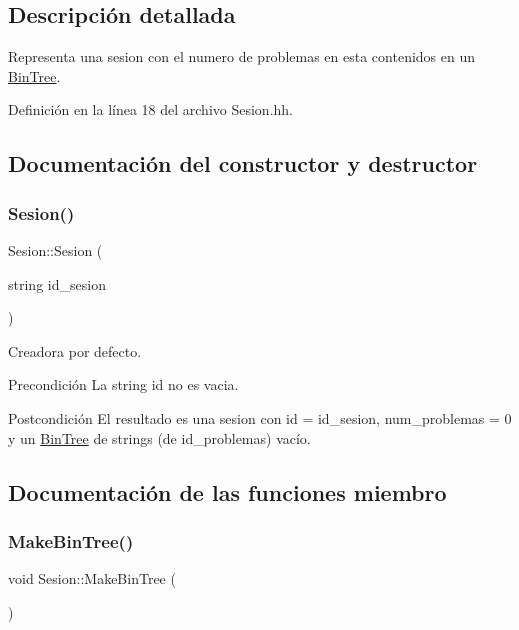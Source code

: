 \subsection{Descripción detallada}
Representa una sesion con el numero de problemas en esta contenidos en un \mbox{\hyperlink{class_bin_tree}{Bin\+Tree}}. 

Definición en la línea 18 del archivo Sesion.\+hh.



\subsection{Documentación del constructor y destructor}
\mbox{\label{class_sesion_a91a29b1563a9f089d6dc50933281a968}} 
\subsubsection{\texorpdfstring{Sesion()}{Sesion()}}
{\footnotesize\ttfamily Sesion\+::\+Sesion (\begin{DoxyParamCaption}\item[{string}]{id\+\_\+sesion }\end{DoxyParamCaption})}



Creadora por defecto. 

\begin{DoxyPrecond}{Precondición}
La string id no es vacia. 
\end{DoxyPrecond}
\begin{DoxyPostcond}{Postcondición}
El resultado es una sesion con id = id\+\_\+sesion, num\+\_\+problemas = 0 y un \mbox{\hyperlink{class_bin_tree}{Bin\+Tree}} de strings (de id\+\_\+problemas) vacío. 
\end{DoxyPostcond}


\subsection{Documentación de las funciones miembro}
\mbox{\label{class_sesion_a0bdd1600ecaf2f98a74ba30611a3bb6f}} 
\subsubsection{\texorpdfstring{Make\+Bin\+Tree()}{MakeBinTree()}}
{\footnotesize\ttfamily void Sesion\+::\+Make\+Bin\+Tree (\begin{DoxyParamCaption}{ }\end{DoxyParamCaption})}



